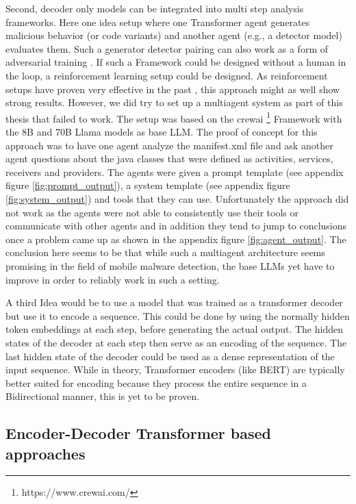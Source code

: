 Second, decoder only models can be integrated into multi step analysis frameworks.
Here one idea setup where one Transformer agent generates malicious behavior (or code variants) 
and another agent (e.g., a detector model) evaluates them. 
Such a generator detector pairing can also work as a form of adversarial training \cite{adversarial_training}.
If such a Framework could be designed without a human in the loop, a reinforcement learning setup 
could be designed. As reinforcement setups have proven very effective in the past \cite{deepseek, alphago}, 
this approach might as well show strong results.
However, we did try to set up a multiagent system as part of this thesis that failed to work.
The setup was based on the crewai \footnote{https://www.crewai.com/} Framework with the 8B and 70B Llama models \cite{llama3modelcard} 
as base LLM. The proof of concept for this approach was to have one agent analyze the manifest.xml file
and ask another agent questions about the java classes that were defined as activities, services, 
receivers and providers. The agents were given a prompt template (see appendix figure \ref{fig:prompt_output}), 
a system template (see appendix figure \ref{fig:system_output}) and tools that they can use.
Unfortunately the approach did not work as the agents were not able to consistently use their 
tools or communicate with other agents and in addition they tend to jump to conclusions once 
a problem came up as shown in the appendix figure \ref{fig:agent_output}. The conclusion here seems to be that while such a 
multiagent architecture seems promising in the field of mobile malware detection, the base 
LLMs yet have to improve in order to reliably work in such a setting.

A third Idea would be to use a model that was trained as a transformer decoder but use it 
to encode a sequence. This could be done by using the normally hidden token embeddings
at each step, before generating the actual output.
The hidden states of the decoder at each step then serve as an encoding of the sequence.
The last hidden state of the decoder could be used as a dense representation 
of the input sequence.
While in theory, Transformer encoders (like BERT) are typically better 
suited for encoding because they 
process the entire sequence in a Bidirectional manner,
this is yet to be proven.

\subsection{Encoder-Decoder Transformer based approaches}

